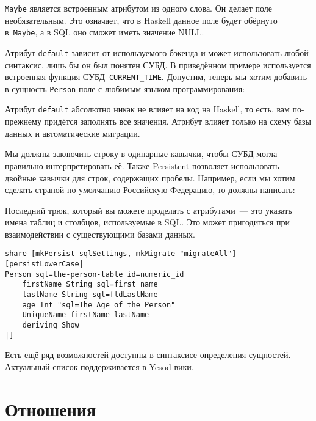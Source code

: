 
\lstinline'Maybe' является встроенным атрибутом из одного слова. Он делает поле
необязательным. Это означает, что в Haskell данное поле будет обёрнуто
в~\lstinline'Maybe', а в SQL оно сможет иметь значение NULL.

Атрибут \lstinline'default' зависит от используемого бэкенда и может
использовать любой синтаксис, лишь бы он был понятен СУБД. В приведённом
примере используется встроенная функция СУБД~\lstinline'CURRENT_TIME'.
Допустим, теперь мы хотим добавить в сущность \lstinline'Person' поле с любимым
языком программирования:


\begin{remark}
    Атрибут \lstinline'default' абсолютно никак не влияет на код на Haskell, то
    есть, вам по-прежнему придётся заполнять все значения. Атрибут влияет
    только на схему базы данных и автоматические миграции.
\end{remark}

Мы должны заключить строку в одинарные кавычки, чтобы СУБД могла правильно
интерпретировать её. Также Persistent позволяет использовать двойные кавычки
для строк, содержащих пробелы. Например, если мы хотим сделать страной по
умолчанию Российскую Федерацию, то должны написать:


Последний трюк, который вы можете проделать с атрибутами~--- это указать имена
таблиц и столбцов, используемые в SQL. Это может пригодиться при взаимодействии
с существующими базами данных.

\begin{lstlisting}
share [mkPersist sqlSettings, mkMigrate "migrateAll"] [persistLowerCase|
Person sql=the-person-table id=numeric_id
    firstName String sql=first_name
    lastName String sql=fldLastName
    age Int "sql=The Age of the Person"
    UniqueName firstName lastName
    deriving Show
|]
\end{lstlisting}

Есть ещё ряд возможностей доступны в синтаксисе определения сущностей.
Актуальный список поддерживается в
%
{Yesod вики}.

\section{Отношения}

